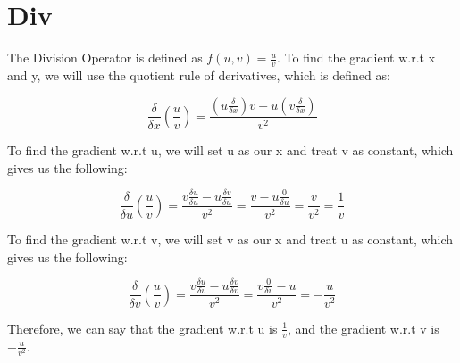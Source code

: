 \documentclass{article}
\begin{document}
\noindent\makebox[\linewidth]{\rule{\paperwidth}{0.4pt}}
    \section{Div}
        The Division Operator is defined as $f(u, v) = \frac{u}{v}$. To find the gradient w.r.t x and y, we will
        use the quotient rule of derivatives, which is defined as:

        $$\frac{\delta}{\delta{x}}(\frac{u}{v}) = \frac{(u\frac{\delta}{\delta{x}})v - u(v\frac{\delta}{\delta{x}})}{v^2}$$

        To find the gradient w.r.t u, we will set u as our x and treat v as constant, which gives us the following:

        $$\frac{\delta}{\delta{u}}(\frac{u}{v}) = \frac{v\frac{\delta{u}}{\delta{u}} - u\frac{\delta{v}}{\delta{u}}}{v^2} 
        = \frac{v - u\frac{0}{\delta{u}}}{v^2} = \frac{v}{v^2} = \frac{1}{v}$$

        To find the gradient w.r.t v, we will set v as our x and treat u as constant, which gives us the following:

        $$\frac{\delta}{\delta{v}}(\frac{u}{v}) = \frac{v\frac{\delta{u}}{\delta{v}} - u\frac{\delta{v}}{\delta{v}}}{v^2} 
        = \frac{v\frac{0}{\delta{v}} - u}{v^2} = -\frac{u}{v^2}$$

        Therefore, we can say that the gradient w.r.t u is $\frac{1}{v}$, and the gradient w.r.t v is $-\frac{u}{v^2}$.

\noindent\makebox[\linewidth]{\rule{\paperwidth}{0.4pt}}
\end{document}
